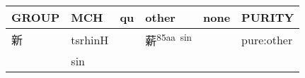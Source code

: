 \documentclass[14pt,a4paper]{scrartcl}
\begin{document}
\begin{longtable}[c]{@{}llllll@{}}
\toprule
\begin{minipage}[b]{0.14\columnwidth}\raggedright\strut
GROUP
\strut\end{minipage} &
\begin{minipage}[b]{0.14\columnwidth}\raggedright\strut
MCH
\strut\end{minipage} &
\begin{minipage}[b]{0.14\columnwidth}\raggedright\strut
qu
\strut\end{minipage} &
\begin{minipage}[b]{0.14\columnwidth}\raggedright\strut
other
\strut\end{minipage} &
\begin{minipage}[b]{0.14\columnwidth}\raggedright\strut
none
\strut\end{minipage} &
\begin{minipage}[b]{0.14\columnwidth}\raggedright\strut
PURITY
\strut\end{minipage}\tabularnewline
\midrule
\endhead
\begin{minipage}[t]{0.14\columnwidth}\raggedright\strut
新
\strut\end{minipage} &
\begin{minipage}[t]{0.14\columnwidth}\raggedright\strut
tsrhinH
\strut\end{minipage} &
\begin{minipage}[t]{0.14\columnwidth}\raggedright\strut
\strut\end{minipage} &
\begin{minipage}[t]{0.14\columnwidth}\raggedright\strut
薪\textsuperscript{85aa~sin}
\strut\end{minipage} &
\begin{minipage}[t]{0.14\columnwidth}\raggedright\strut
\strut\end{minipage} &
\begin{minipage}[t]{0.14\columnwidth}\raggedright\strut
pure:other
\strut\end{minipage}\tabularnewline
\begin{minipage}[t]{0.14\columnwidth}\raggedright\strut
𣐽
\strut\end{minipage} &
\begin{minipage}[t]{0.14\columnwidth}\raggedright\strut
sin
\strut\end{minipage} &
\begin{minipage}[t]{0.14\columnwidth}\raggedright\strut
\strut\end{minipage} &

\end{longtable}
\end{document}
